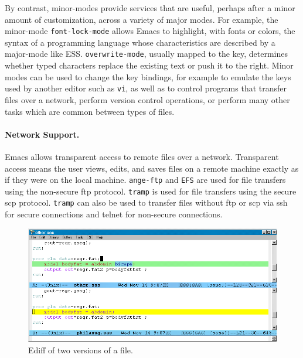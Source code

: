 \documentclass{article}
\newif\ifdraft
\newcommand{\stexttt}[1]{{\small\texttt{#1}}}
\newcommand{\ssf}[1]{{\small\sf{#1}}}
\newcommand{\emptyfig}{
\hspace*{42pt}\rule{324pt}{.25pt}\\
\hspace*{42pt}\rule{.25pt}{10pc}
\rule{316pt}{.25pt}
\rule{.25pt}{10pc}}
\begin{document}
By contrast, minor-modes provide services that are useful, perhaps
after a minor amount of customization, across a variety of major
modes.  For example, the minor-mode \stexttt{font-lock-mode} allows
Emacs to highlight, with fonts or colors, the syntax of a programming
language whose characteristics are described by a major-mode like
ESS\@.  \stexttt{overwrite-mode}, usually mapped to the \ssf{Insert}
key, determines whether typed characters replace the existing text or
push it to the right.  Minor modes can be used to change the key
bindings, for example to emulate the keys used by another editor such
as \stexttt{vi}, as well as to control programs that transfer files
over a network, perform version control operations, or perform many
other tasks which are common between types of files.

\paragraph{Network Support.}
Emacs allows transparent access to remote files over a network.
Transparent access means the user views, edits, and saves files on a
remote machine exactly as if they were on the local machine.
\stexttt{ange-ftp} and \stexttt{EFS} are used for file transfers using
the non-secure ftp protocol.  \stexttt{tramp} is used for file
transfers using the secure scp protocol.  \stexttt{tramp} can also be
used to transfer files without ftp or scp via ssh for secure
connections and telnet for non-secure connections.


\begin{figure}[htbp] 
 \centering
\ifdraft
  \emptyfig
\else
  \includegraphics[angle=270,width=\textwidth]{ediff-sas}
\fi
  \caption{Ediff of two versions of a file.}
  \label{f.ediff}
\end{figure}
\end{document}
